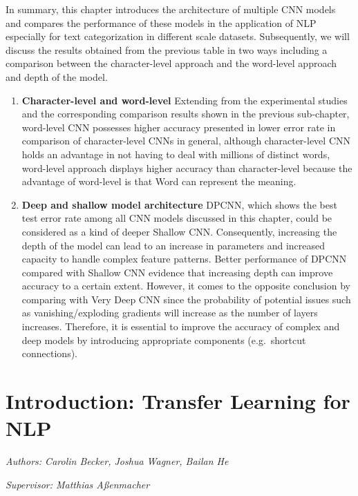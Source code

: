 \documentclass[]{krantz}
\begin{document}
In summary, this chapter introduces the architecture of multiple CNN models and compares the performance of these models in the application of NLP especially for text categorization in different scale datasets. Subsequently, we will discuss the results obtained from the previous table in two ways including a comparison between the character-level approach and the word-level approach and depth of the model.

\begin{enumerate}
\def\labelenumi{\arabic{enumi}.}
\item
  \textbf{Character-level and word-level} Extending from the experimental studies and the corresponding comparison results shown in the previous sub-chapter, word-level CNN possesses higher accuracy presented in lower error rate in comparison of character-level CNNs in general, although character-level CNN holds an advantage in not having to deal with millions of distinct words, word-level approach displays higher accuracy than character-level because the advantage of word-level is that Word can represent the meaning.
\item
  \textbf{Deep and shallow model architecture} DPCNN, which shows the best test error rate among all CNN models discussed in this chapter, could be considered as a kind of deeper Shallow CNN. Consequently, increasing the depth of the model can lead to an increase in parameters and increased capacity to handle complex feature patterns. Better performance of DPCNN compared with Shallow CNN evidence that increasing depth can improve accuracy to a certain extent. However, it comes to the opposite conclusion by comparing with Very Deep CNN since the probability of potential issues such as vanishing/exploding gradients will increase as the number of layers increases. Therefore, it is essential to improve the accuracy of complex and deep models by introducing appropriate components (e.g.~shortcut connections).
\end{enumerate}

\hypertarget{introduction-transfer-learning-for-nlp}{%
\chapter{Introduction: Transfer Learning for NLP}\label{introduction-transfer-learning-for-nlp}}

\emph{Authors: Carolin Becker, Joshua Wagner, Bailan He}

\emph{Supervisor: Matthias Aßenmacher}
\end{document}
